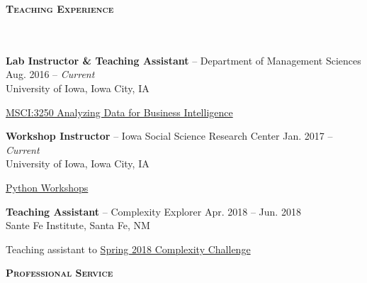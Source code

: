 \documentclass{article}
\newcommand{\header}[1]{{
\hspace*{-15pt}\vspace*{6pt} \textbf{\textsc{\large{#1}}}} \vspace*{-6pt} 
\lineunder
}
\newcommand{\lineunder}{
\vspace*{-8pt} \\ \hspace*{-15pt} 
\hrulefill \\
}
\newcommand{\employer}[4]{{
\vspace*{2pt}%
\textbf{#1} #2 \hfill #3\\ #4 \vspace*{2pt}}
}
\renewcommand{\labelitemii}{
$\vcenter{\hbox{\tiny$\bullet$}}$\hspace*{-3pt}
}
\newenvironment{bullet-list-minor}{
\begin{list}{\labelitemii}{\setlength\leftmargin{15pt} 
\topsep 0pt \itemsep -2pt}}{\vspace*{4pt}\end{list}
}
\begin{document}
\vspace*{4pt}
\header{Teaching Experience}
    \employer{Lab Instructor \& Teaching Assistant}{-- Department of Management Sciences}{Aug. 2016 -- \textit{Current}}{University of Iowa, Iowa City, IA}
	\begin{bullet-list-minor}
        \item {\href{https://myui.uiowa.edu/my-ui/courses/dashboard.page?q.courseSubject=MSCI&q.courseNumber=3250&showResults=1}{MSCI:3250 Analyzing Data for Business Intelligence}}
    \end{bullet-list-minor}
    
    \employer{Workshop Instructor}{-- Iowa Social Science Research Center}{Jan. 2017 -- \textit{Current}}{University of Iowa, Iowa City, IA}
	\begin{bullet-list-minor}
        \item \href{https://github.com/zhiyzuo/python-tutorial}{Python Workshops}
    \end{bullet-list-minor}
    
    \employer{Teaching Assistant}{-- Complexity Explorer}{Apr. 2018 -- Jun. 2018}{Sante Fe Institute, Santa Fe, NM}
	\begin{bullet-list-minor}
        \item Teaching assistant to \href{https://www.complexityexplorer.org/challenges/2-spring-2018-complexity-challenge}{Spring 2018 Complexity Challenge}
    \end{bullet-list-minor}
    

\vspace*{4pt}
\header{Professional Service}
\end{document}
